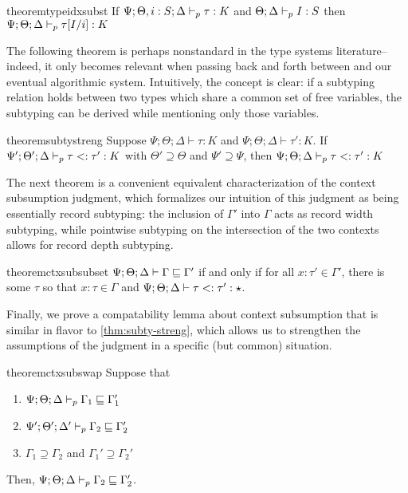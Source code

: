 \begin{restatable}{theorem}{typeidxsubst}
\label{thm:type-idx-subst}
If $\Psi ; \Theta, i : S ; \Delta \vdash_p \tau : K$ and $\Theta ; \Delta \vdash_p I : S$ then $\Psi ; \Theta ; \Delta \vdash_p \tau[I/i] : K$
\end{restatable}

The following theorem is perhaps nonstandard in the type systems literature-- indeed, it only becomes relevant when passing back and forth between \dlambdaamor and our eventual algorithmic system. Intuitively, the concept is clear: if a subtyping relation holds between two types which share a common set of free variables, the subtyping can be derived while mentioning only those variables.

\begin{restatable}{theorem}{subtystreng}
\label{thm:subty-streng}
Suppose $\Psi ; \Theta ; \Delta \vdash \tau : K$ and $\Psi ; \Theta ; \Delta \vdash \tau' : K$.
If $\Psi' ; \Theta' ; \Delta \vdash_p \tau <: \tau' : K$ with $\Theta' \supseteq \Theta$ and $\Psi' \supseteq \Psi$, then $\Psi ; \Theta ; \Delta \vdash_p \tau <: \tau' : K$
\end{restatable}

The next theorem is a convenient equivalent characterization of the context subsumption judgment, which formalizes our intuition of this judgment as being essentially record subtyping: the inclusion of $\Gamma'$ into $\Gamma$ acts as record width subtyping, while pointwise subtyping on the intersection of the two contexts allows for record depth subtyping.

\begin{restatable}{theorem}{ctxsubsubset}
\label{thm:ctx-sub-subset2}
$\Psi ; \Theta ; \Delta \vdash \Gamma \sqsubseteq \Gamma'$ if and only if for all $x : \tau' \in \Gamma'$, there is some $\tau$ so that $x : \tau \in \Gamma$ and $\Psi ; \Theta ; \Delta \vdash \tau <: \tau' : \star$.
\end{restatable}

Finally, we prove a compatability lemma about context subsumption that is similar in flavor to \autoref{thm:subty-streng}, which allows us to strengthen the assumptions of the judgment in a specific (but common) situation.

\begin{restatable}{theorem}{ctxsubswap}
\label{thm:ctx-sub-swap}
Suppose that
\begin{enumerate}
  \item $\Psi ; \Theta ; \Delta \vdash_p \Gamma_1 \sqsubseteq \Gamma_1'$
  \item $\Psi' ; \Theta' ;  \Delta' \vdash_p \Gamma_2 \sqsubseteq \Gamma_2'$
  \item $\Gamma_1 \supseteq \Gamma_2$ and $\Gamma_1' \supseteq \Gamma_2'$
\end{enumerate}
Then, $\Psi ; \Theta ; \Delta \vdash_p \Gamma_2 \sqsubseteq \Gamma_2'$.
\end{restatable}


